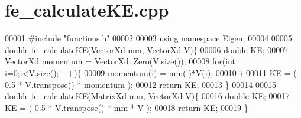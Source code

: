 \hypertarget{fe__calculate_k_e_8cpp_source}{}\section{fe\+\_\+calculate\+K\+E.\+cpp}
\label{fe__calculate_k_e_8cpp_source}

\begin{DoxyCode}
00001 \textcolor{preprocessor}{#include "\hyperlink{functions_8h}{functions.h}"}
00002 
00003 \textcolor{keyword}{using namespace }\hyperlink{namespace_eigen}{Eigen};
00004 
\hyperlink{fe__calculate_k_e_8cpp_afb8a8298008daf8f2e705a9acb72b984}{00005} \textcolor{keywordtype}{double} \hyperlink{fe__calculate_k_e_8cpp_afb8a8298008daf8f2e705a9acb72b984}{fe\_calculateKE}(VectorXd mm, VectorXd V)\{
00006   \textcolor{keywordtype}{double} KE;
00007   VectorXd momentum = VectorXd::Zero(V.size());
00008   \textcolor{keywordflow}{for}(\textcolor{keywordtype}{int} i=0;i<V.size();i++)\{
00009     momentum(i) = mm(i)*V(i);
00010   \}
00011   KE = ( 0.5 * V.transpose() * momentum );
00012   \textcolor{keywordflow}{return} KE;
00013 \}
00014 
\hyperlink{fe__calculate_k_e_8cpp_a0bdf25bf63fdb63302feaecb1284626e}{00015} \textcolor{keywordtype}{double} \hyperlink{fe__calculate_k_e_8cpp_afb8a8298008daf8f2e705a9acb72b984}{fe\_calculateKE}(MatrixXd mm, VectorXd V)\{
00016   \textcolor{keywordtype}{double} KE;
00017   KE = ( 0.5 * V.transpose() * mm * V );
00018   \textcolor{keywordflow}{return} KE;
00019 \}
\end{DoxyCode}
